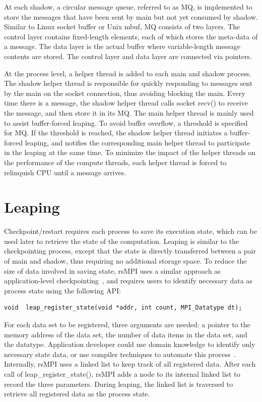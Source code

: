 At each shadow, a circular message queue, referred to as MQ, is implemented to store the messages that have been sent by main but not yet consumed by shadow. Similar to Linux socket buffer or Unix mbuf, MQ consists of two layers. The control layer contains fixed-length elements, each of which stores the meta-data of a message. The data layer is the actual buffer where variable-length message contents are stored. The control layer and data layer are connected via pointers. 

At the process level, a helper thread is added to each main and shadow process. The shadow helper thread is responsible for quickly responding to messages sent by the main on the socket connection, thus avoiding blocking the main. Every time there is a message, the shadow helper thread calls socket recv() to receive the message, and then store it in its MQ. The main helper thread is mainly used to assist buffer-forced leaping. To avoid buffer overflow, a threshold is specified for MQ. If the threshold is reached, the shadow helper thread initiates a buffer-forced leaping, and notifies the corresponding main helper thread to participate in the leaping at the same time. To minimize the impact of the helper threads on the performance of the compute threads, each helper thread is forced to relinquish CPU until a message arrives.





\section{Leaping}
Checkpoint/restart requires each process to save its execution state, which can be used later to retrieve the state of the computation. 
Leaping is similar to the checkpointing process, except that the state is directly transferred between a pair of main and shadow, thus requiring no additional storage space. 
To reduce the size of data involved in saving state, rsMPI uses a similar approach as application-level checkpointing~\cite{beguelin1997application,ni_2013_acr}, and requires users to identify necessary data as process state using the following API:

\begin{lstlisting}
void  leap_register_state(void *addr, int count, MPI_Datatype dt);
\end{lstlisting}

For each data set to be registered, three arguments are needed: a pointer to the memory address of the data set, the number of data items in the data set, and the datatype. 
Application developer could use domain knowledge to identify only necessary state data, or use compiler techniques to automate this process~\cite{Bronevetsky:09:Compiler}. 
Internally, rsMPI uses a linked list to keep track of all registered data. After each call of leap\_register\_state(), rsMPI adds a node to its internal linked list to record the three parameters. 
During leaping, the linked list is traversed to retrieve all registered data as the process state.

